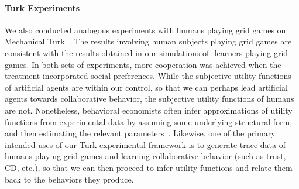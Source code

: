 
\vspace{\up}
\paragraph{Turk Experiments}
\label{sec:human}

We also conducted analogous experiments with humans playing grid games
on Mechanical Turk~\cite{}.
%
%
The results involving human subjects playing grid games are consistent
with the results obtained in our simulations of \Q-learners playing
grid games.  In both sets of experiments, more cooperation was
achieved when the treatment incorporated social preferences.  While
the subjective utility functions of artificial agents are within our
control, so that we can perhaps lead artificial agents towards
collaborative behavior, the subjective utility functions of humans are
not.  Nonetheless, behavioral economists often infer approximations of
utility functions from experimental data by assuming some underlying
structural form, and then estimating the relevant
parameters~\cite{blanco11,fisman07}.  Likewise, one of the primary
intended uses of our Turk experimental framework is to generate trace
data of humans playing grid games and learning collaborative behavior
(such as trust, CD, etc.), so that we can then proceed to infer
utility functions and relate them back to the behaviors they produce.

